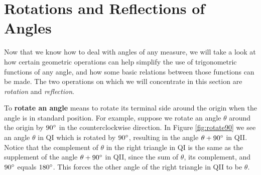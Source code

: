 \section{Rotations and Reflections of Angles}
Now that we know how to deal with angles of any measure, we will take a look at how certain
geometric operations can help simplify the use of trigonometric functions of any angle, and how some
basic relations between those functions can be made. The two operations on which we will concentrate
in this section are \emph{rotation} and \emph{reflection}.

To \textbf{rotate an angle} means to rotate its terminal side around the origin when the angle is
in standard position. For example, suppose we rotate an angle $\theta$ around the origin by
$90^\circ$ in the counterclockwise direction. In Figure
\ref{fig:rotate90} we see an angle $\theta$ in QI which is rotated by $90^\circ$, resulting in
the angle $\theta + 90^\circ$ in QII. Notice that the complement of $\theta$ in
the right triangle in QI is the same as the supplement of the angle $\theta + 90^\circ$ in QII,
since the sum of $\theta$, its complement, and $90^\circ$ equals $180^\circ$. This forces the
other angle of the right triangle in QII to be $\theta$.

